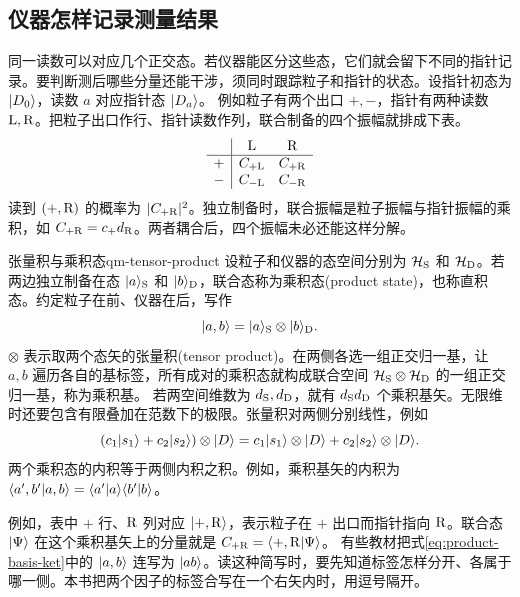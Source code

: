 \subsection{仪器怎样记录测量结果}
\label{ss:measurement-record}

同一读数可以对应几个正交态。若仪器能区分这些态，它们就会留下不同的指针记录。要判断测后哪些分量还能干涉，须同时跟踪粒子和指针的状态。设指针初态为 $\lvert D_0\rangle$，读数 $a$ 对应指针态 $\lvert D_a\rangle$。
例如粒子有两个出口 $+,-$，指针有两种读数 $\mathrm{L},\mathrm{R}$。把粒子出口作行、指针读数作列，联合制备的四个振幅就排成下表。
\[
   \begin{array}{c|cc}
        & \mathrm{L} & \mathrm{R}\\ \hline
      + & C_{+\mathrm{L}} & C_{+\mathrm{R}}\\
      -& C_{-\mathrm{L}} & C_{-\mathrm{R}}
   \end{array}
\]
读到 $(+,\mathrm{R})$ 的概率为 $\lvert C_{+\mathrm{R}}\rvert^2$。独立制备时，联合振幅是粒子振幅与指针振幅的乘积，如 $C_{+\mathrm{R}} = c_+d_{\mathrm{R}}$。两者耦合后，四个振幅未必还能这样分解。
\begin{definition}{张量积与乘积态}{qm-tensor-product}
    设粒子和仪器的态空间分别为 $\mathcal H_{\mathrm{S}}$ 和 $\mathcal H_{\mathrm{D}}$。若两边独立制备在态 $\lvert a\rangle_{\mathrm{S}}$ 和 $\lvert b\rangle_{\mathrm{D}}$，联合态称为乘积态(product state)，也称直积态。约定粒子在前、仪器在后，写作
    \begin{equation}
        \lvert a,b\rangle = \lvert a\rangle_{\mathrm{S}} \otimes \lvert b\rangle_{\mathrm{D}} .
        \label{eq:product-basis-ket}
    \end{equation}
    $\otimes$ 表示取两个态矢的张量积(tensor product)。在两侧各选一组正交归一基，让 $a,b$ 遍历各自的基标签，所有成对的乘积态就构成联合空间 $\mathcal H_{\mathrm{S}} \otimes \mathcal H_{\mathrm{D}}$ 的一组正交归一基，称为乘积基。
    若两空间维数为 $d_{\mathrm{S}},d_{\mathrm{D}}$，就有 $d_{\mathrm{S}} d_{\mathrm{D}}$ 个乘积基矢。无限维时还要包含有限叠加在范数下的极限。张量积对两侧分别线性，例如
    \[
        (c_1\lvert s_1\rangle + c_2\lvert s_2\rangle) \otimes \lvert D\rangle
        = c_1\lvert s_1\rangle \otimes \lvert D\rangle + c_2\lvert s_2\rangle \otimes \lvert D\rangle.
    \]
    两个乘积态的内积等于两侧内积之积。例如，乘积基矢的内积为 $\langle a',b'\vert a,b\rangle = \langle a'\vert a\rangle\langle b'\vert b\rangle$。
\end{definition}
例如，表中 $+$ 行、$\mathrm{R}$ 列对应 $\lvert+,\mathrm{R}\rangle$，表示粒子在 $+$ 出口而指针指向 $\mathrm{R}$。联合态 $\lvert\Psi\rangle$ 在这个乘积基矢上的分量就是 $C_{+\mathrm{R}} = \langle+,\mathrm{R}\vert\Psi\rangle$。
有些教材把式\eqref{eq:product-basis-ket}中的 $\lvert a,b\rangle$ 连写为 $\lvert ab\rangle$。读这种简写时，要先知道标签怎样分开、各属于哪一侧。本书把两个因子的标签合写在一个右矢内时，用逗号隔开。

